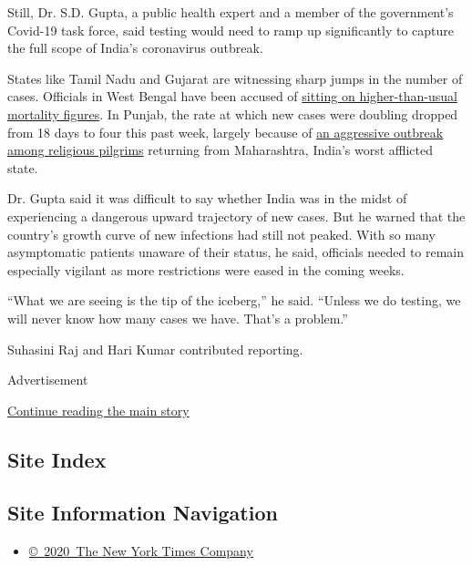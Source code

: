 Still, Dr. S.D. Gupta, a public health expert and a member of the
government's Covid-19 task force, said testing would need to ramp up
significantly to capture the full scope of India's coronavirus outbreak.

States like Tamil Nadu and Gujarat are witnessing sharp jumps in the
number of cases. Officials in West Bengal have been accused of
\href{https://www.thehindu.com/news/cities/kolkata/extremely-high-mortality-rate-in-west-bengal-says-central-team/article31501093.ece}{sitting
on higher-than-usual mortality figures}. In Punjab, the rate at which
new cases were doubling dropped from 18 days to four this past week,
largely because of
\href{https://timesofindia.indiatimes.com/city/chandigarh/punjabs-double-whammy-no-let-up-in-spiralling-cases/articleshow/75545299.cms}{an
aggressive outbreak among religious pilgrims} returning from
Maharashtra, India's worst afflicted state.

Dr. Gupta said it was difficult to say whether India was in the midst of
experiencing a dangerous upward trajectory of new cases. But he warned
that the country's growth curve of new infections had still not peaked.
With so many asymptomatic patients unaware of their status, he said,
officials needed to remain especially vigilant as more restrictions were
eased in the coming weeks.

``What we are seeing is the tip of the iceberg,'' he said. ``Unless we
do testing, we will never know how many cases we have. That's a
problem.''

Suhasini Raj and Hari Kumar contributed reporting.

Advertisement

\protect\hyperlink{after-bottom}{Continue reading the main story}

\hypertarget{site-index}{%
\subsection{Site Index}\label{site-index}}

\hypertarget{site-information-navigation}{%
\subsection{Site Information
Navigation}\label{site-information-navigation}}

\begin{itemize}
\tightlist
\item
  \href{https://help.nytimes.com/hc/en-us/articles/115014792127-Copyright-notice}{©~2020~The
  New York Times Company}
\end{itemize}


